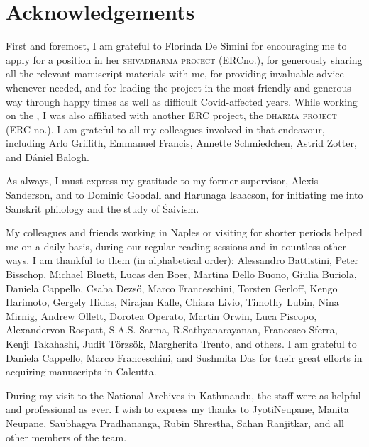 \thispagestyle{empty}
\chapter*{Acknowledgements}
\label{acknowledgements}
\vspace{-1em}

\noindent
First and foremost, I am grateful to Florinda De Simini for
encouraging me to apply for a position in her 
\textsc{\hbox{shivadharma} project} (ERC\linebreak no.),
for generously sharing all the relevant manuscript materials with me, 
for providing invaluable advice whenever needed, and for 
leading the project in the most friendly and
generous way through happy times as well as 
difficult Covid-affected years. 
While working on the \Vss, I was also affiliated with 
another ERC project, the \textsc{dharma project} (ERC no.).
I am grateful to all my colleagues involved in that endeavour,
including Arlo Griffith, Emmanuel Francis, Annette Schmiedchen, 
Astrid Zotter, and Dániel Balogh.

As always, I must express my gratitude to my former supervisor,
Alexis Sanderson, and to Dominic Goodall and 
Harunaga Isaacson, for initiating me into Sanskrit philology and
the study of Śaivism.

My colleagues and friends working in Naples or visiting for
shorter periods helped me on a daily basis, during our regular reading sessions and in countless
other ways. I am thankful to them (in alphabetical order):
Alessandro Battistini, 
Peter Bisschop,
Michael Bluett, 
Lucas den Boer,\linebreak 
Martina Dello Buono, 
Giulia Buriola, 
Daniela Cappello,
Csaba Dezső,\linebreak
Marco \mbox{Franceschini}, 
Torsten Gerloff, 
Kengo Harimoto, 
Gergely Hidas,
Nirajan Kafle, 
Chiara Livio, 
Timothy Lubin, 
Nina Mirnig, 
Andrew \linebreak Ollett,
Dorotea Operato, 
Martin Orwin, 
Luca Piscopo, 
Alexander\linebreak von Rospatt, 
S.\thinspace A.\thinspace S. Sarma,
R.\thinspace Sathyanarayanan, 
Francesco Sferra, 
Kenji Takahashi, 
Judit Törzsök,
Margherita Trento, 
and others.
I am grateful to Daniela Cappello, Marco Franceschini, 
and Sushmita Das for their great efforts in acquiring manu\-scripts in Calcutta.

During my visit to the National Archives in
Kathmandu, the staff were as helpful and professional as ever.
I wish to express my thanks to Jyoti\linebreak Neupane, Manita Neupane, Saubhagya Pradhananga, Rubin Shrestha,\linebreak
Sahan Ranjitkar, and all %
other members of the team.

